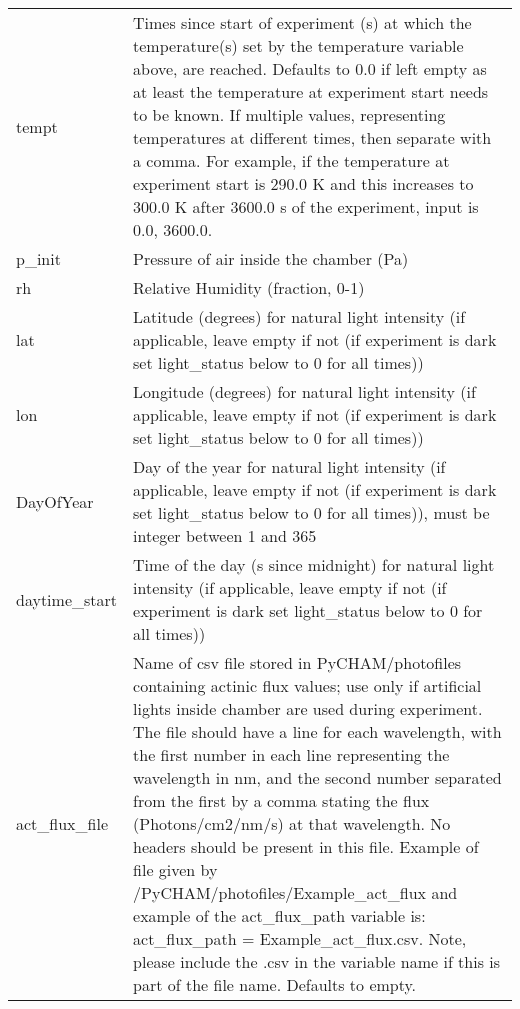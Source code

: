 \documentclass[gmd, manuscript]{copernicus}
\begin{document}
\begin{center}
\begin{supertabular}{p{0.15\textwidth}p{0.75\textwidth}}
tempt & Times since start of experiment (s) at which the temperature(s) set by the temperature variable above, are reached.  Defaults to 0.0 if left empty as at least the temperature at experiment start needs to be known.  If multiple values, representing temperatures at different times, then separate with a comma.  For example, if the temperature at experiment start is 290.0 K and this increases to 300.0 K after 3600.0 s of the experiment, input is 0.0, 3600.0.\\

p\_init &  Pressure of air inside the chamber (Pa)\\

rh & Relative Humidity (fraction, 0-1)\\

lat & Latitude (degrees) for natural light intensity (if applicable, leave empty if not (if experiment is dark set light\_status below to 0 for all times))\\
lon & Longitude (degrees) for natural light intensity (if applicable, leave empty if not (if experiment is dark set light\_status below to 0 for all times))\\	

DayOfYear & Day of the year for natural light intensity (if applicable, leave empty if not (if experiment is dark set light\_status below to 0 for all times)), must be integer between 1 and 365\\

daytime\_start & Time of the day (s since midnight) for natural light intensity (if applicable, leave empty if not (if experiment is dark set light\_status below to 0 for all times)) \\

act\_flux\_file & Name of csv file stored in PyCHAM/photofiles containing actinic flux values; use only if artificial lights inside chamber are used during experiment.  The file should have a line for each wavelength, with the first number in each line representing the wavelength in nm, and the second number separated from the first by a comma stating the flux (Photons/cm2/nm/s) at that wavelength.  No headers should be present in this file.  Example of file given by /PyCHAM/photofiles/Example\_act\_flux and example of the act\_flux\_path variable is: act\_flux\_path = Example\_act\_flux.csv.  Note, please include the .csv in the variable name if this is part of the file name.  Defaults to empty.\\


\end{supertabular}
\end{center}
\end{document}
